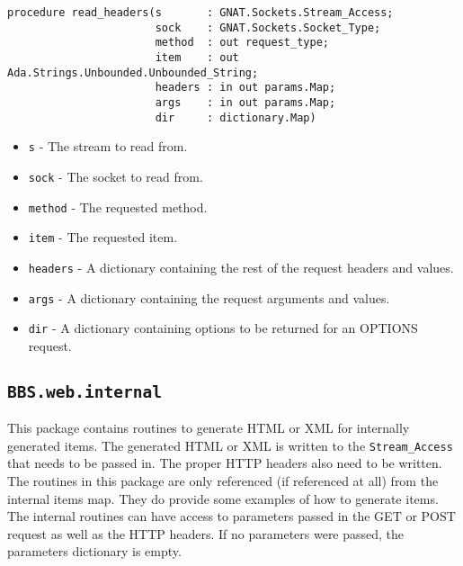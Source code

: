 \documentclass[10pt, openany]{book}
\newcommand{\package}[1]{\texttt{#1}}
\newcommand{\keyword}[1]{\texttt{#1}}
\newcommand{\datatype}[1]{\texttt{#1}}
\begin{document}
\begin{lstlisting}
procedure read_headers(s       : GNAT.Sockets.Stream_Access;
                       sock    : GNAT.Sockets.Socket_Type;
                       method  : out request_type;
                       item    : out Ada.Strings.Unbounded.Unbounded_String;
                       headers : in out params.Map;
                       args    : in out params.Map;
                       dir     : dictionary.Map)
\end{lstlisting}
\begin{itemize}
  \item \keyword{s} - The stream to read from.
  \item \keyword{sock} - The socket to read from.
  \item \keyword{method} - The requested method.
  \item \keyword{item} - The requested item.
  \item \keyword{headers} - A dictionary containing the rest of the request headers and values.
  \item \keyword{args} - A dictionary containing the request arguments and values.
  \item \keyword{dir} - A dictionary containing options to be returned for an OPTIONS request.
\end{itemize}

\subsection{\package{BBS.web.internal}}
This package contains routines to generate HTML or XML for internally generated items.  The generated HTML or XML is written to the \datatype{Stream\_Access} that needs to be passed in.  The proper HTTP headers also need to be written.  The routines in this package are only referenced (if referenced at all) from the internal items map.  They do provide some examples of how to generate items.  The internal routines can have access to parameters passed in the GET or POST request as well as the HTTP headers.  If no parameters were passed, the parameters dictionary is empty.
\end{document}
